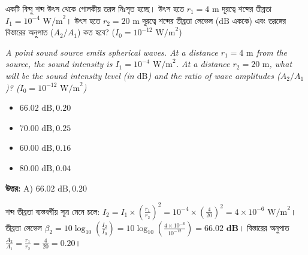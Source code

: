 \documentclass[12pt, a4paper]{article}
\begin{document}
\begin{tcolorbox}[questionbox={প্রশ্ন (Question) 15}]
    \noindent
    একটি বিন্দু শব্দ উৎস থেকে গোলকীয় তরঙ্গ নিঃসৃত হচ্ছে। উৎস হতে $r_1 = 4\text{ m}$ দূরত্বে শব্দের তীব্রতা $I_1 = 10^{-4}\text{ W/m}^2$। উৎস হতে $r_2 = 20\text{ m}$ দূরত্বে শব্দের তীব্রতা লেভেল ($\text{dB}$ এককে) এবং তরঙ্গের বিস্তারের অনুপাত ($A_2 / A_1$) কত হবে? ($I_0 = 10^{-12}\text{ W/m}^2$)
    
    \vspace{0.8em}
    \begin{english}
    \noindent\textit{\color{darkgray}
    A point sound source emits spherical waves. At a distance $r_1 = 4\text{ m}$ from the source, the sound intensity is $I_1 = 10^{-4}\text{ W/m}^2$. At a distance $r_2 = 20\text{ m}$, what will be the sound intensity level (in $\text{dB}$) and the ratio of wave amplitudes ($A_2 / A_1$)? ($I_0 = 10^{-12}\text{ W/m}^2$)
    }
    \end{english}
\end{tcolorbox}

\begin{itemize}[label={}, leftmargin=1cm, itemsep=0.5em]
    \item[\textbf{A)}] $66.02\text{ dB}, 0.20$
    \item[\textbf{B)}] $70.00\text{ dB}, 0.25$
    \item[\textbf{C)}] $60.00\text{ dB}, 0.16$
    \item[\textbf{D)}] $80.00\text{ dB}, 0.04$
\end{itemize}

\vspace{0.5em}
\begin{tcolorbox}[answerbox]
    \textbf{\color{success} উত্তর:} A) $66.02\text{ dB}, 0.20$
\end{tcolorbox}
\vspace{1em}

\begin{tcolorbox}[solutionbox={সমাধান (Solution)}]
    \noindent
    শব্দ তীব্রতা ব্যস্তবর্গীয় সূত্র মেনে চলে: $I_2 = I_1 \times \left(\frac{r_1}{r_2}\right)^2 = 10^{-4} \times \left(\frac{4}{20}\right)^2 = 4 \times 10^{-6}\text{ W/m}^2$। তীব্রতা লেভেল $\beta_2 = 10 \log_{10} \left(\frac{I_2}{I_0}\right) = 10 \log_{10} \left(\frac{4 \times 10^{-6}}{10^{-12}}\right) = \mathbf{66.02\text{ dB}}$। বিস্তারের অনুপাত $\frac{A_2}{A_1} = \frac{r_1}{r_2} = \frac{4}{20} = \mathbf{0.20}$।
\end{tcolorbox}
\end{document}
